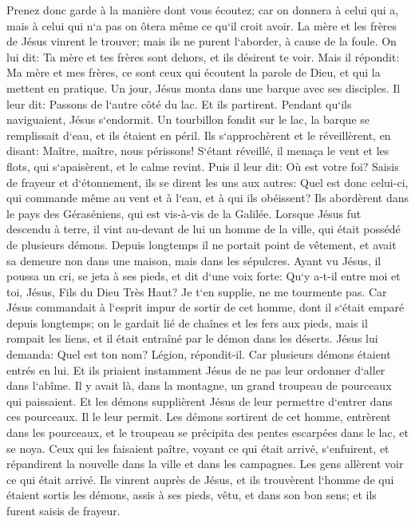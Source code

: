 \verse Prenez donc garde à la manière dont vous écoutez; car on donnera à celui qui a, mais à celui qui n`a pas on ôtera même ce qu`il croit avoir. 
\verse La mère et les frères de Jésus vinrent le trouver; mais ils ne purent l`aborder, à cause de la foule. 
\verse On lui dit: Ta mère et tes frères sont dehors, et ils désirent te voir. 
\verse Mais il répondit: Ma mère et mes frères, ce sont ceux qui écoutent la parole de Dieu, et qui la mettent en pratique. 
\verse Un jour, Jésus monta dans une barque avec ses disciples. Il leur dit: Passons de l`autre côté du lac. Et ils partirent. 
\verse Pendant qu`ils naviguaient, Jésus s`endormit. Un tourbillon fondit sur le lac, la barque se remplissait d`eau, et ils étaient en péril. 
\verse Ils s`approchèrent et le réveillèrent, en disant: Maître, maître, nous périssons! S`étant réveillé, il menaça le vent et les flots, qui s`apaisèrent, et le calme revint. 
\verse Puis il leur dit: Où est votre foi? Saisis de frayeur et d`étonnement, ils se dirent les uns aux autres: Quel est donc celui-ci, qui commande même au vent et à l`eau, et à qui ils obéissent? 
\verse Ils abordèrent dans le pays des Géraséniens, qui est vis-à-vis de la Galilée. 
\verse Lorsque Jésus fut descendu à terre, il vint au-devant de lui un homme de la ville, qui était possédé de plusieurs démons. Depuis longtemps il ne portait point de vêtement, et avait sa demeure non dans une maison, mais dans les sépulcres. 
\verse Ayant vu Jésus, il poussa un cri, se jeta à ses pieds, et dit d`une voix forte: Qu`y a-t-il entre moi et toi, Jésus, Fils du Dieu Très Haut? Je t`en supplie, ne me tourmente pas. 
\verse Car Jésus commandait à l`esprit impur de sortir de cet homme, dont il s`était emparé depuis longtemps; on le gardait lié de chaînes et les fers aux pieds, mais il rompait les liens, et il était entraîné par le démon dans les déserts. 
\verse Jésus lui demanda: Quel est ton nom? Légion, répondit-il. Car plusieurs démons étaient entrés en lui. 
\verse Et ils priaient instamment Jésus de ne pas leur ordonner d`aller dans l`abîme. 
\verse Il y avait là, dans la montagne, un grand troupeau de pourceaux qui paissaient. Et les démons supplièrent Jésus de leur permettre d`entrer dans ces pourceaux. Il le leur permit. 
\verse Les démons sortirent de cet homme, entrèrent dans les pourceaux, et le troupeau se précipita des pentes escarpées dans le lac, et se noya. 
\verse Ceux qui les faisaient paître, voyant ce qui était arrivé, s`enfuirent, et répandirent la nouvelle dans la ville et dans les campagnes. 
\verse Les gens allèrent voir ce qui était arrivé. Ils vinrent auprès de Jésus, et ils trouvèrent l`homme de qui étaient sortis les démons, assis à ses pieds, vêtu, et dans son bon sens; et ils furent saisis de frayeur. 
